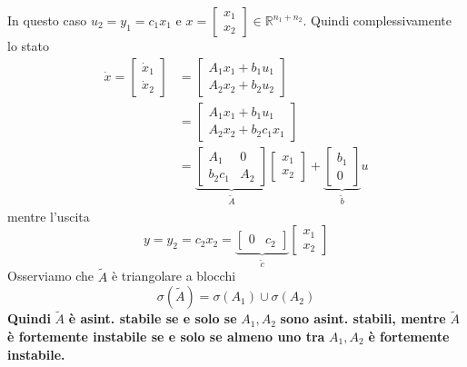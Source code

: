 In questo caso $u_2 =y_1 =c_1 x_1$ e $x=\begin{bmatrix}
x_1\\
x_2
\end{bmatrix} \in \mathbb{R}^{n_1 +n_2}$. Quindi complessivamente lo stato
\begin{equation*}
	\begin{aligned}
		\dot{x} =\begin{bmatrix}
		\dot{x}_1\\
		\dot{x}_2
		\end{bmatrix} & =\begin{bmatrix}             
		A_1 x_1 +b_1 u_1\\
		A_2 x_2 +b_2 u_2
		\end{bmatrix}\\
		              & =\begin{bmatrix}             
		A_1 x_1 +b_1 u_1\\
		A_2 x_2 +b_2 c_1 x_1
		\end{bmatrix}\\
		              & =\underbrace{\begin{bmatrix} 
		A_1           & 0                            \\
		b_2 c_1       & A_2                          
		\end{bmatrix}
		}_{\tilde{A}}\begin{bmatrix}
		x_1\\
		x_2
		\end{bmatrix} +\underbrace{\begin{bmatrix}
		b_1\\
		0
		\end{bmatrix}
		}_{\tilde{b}} u
	\end{aligned}
\end{equation*}
mentre l'uscita
\begin{equation*}
	y=y_2 =c_2 x_2 =\underbrace{\begin{bmatrix}
		0 & c_2
		\end{bmatrix}
		}_{\tilde{c}}\begin{bmatrix}
	x_1\\
	x_2
	\end{bmatrix}
\end{equation*}
Osserviamo che $\tilde{A}$ è triangolare a blocchi
\begin{equation*}
	\boxed{\sigma \left(\tilde{A}\right) =\sigma \left(A_1\right) \cup \sigma \left(A_2\right)}
\end{equation*}
\textbf{Quindi }$\tilde{A}$\textbf{ è asint. stabile se e solo se }$A_1 ,A_2$\textbf{ sono asint. stabili, mentre }$\tilde{A}$\textbf{ è fortemente instabile se e solo se almeno uno tra }$A_1 ,A_2$\textbf{ è fortemente instabile.}

